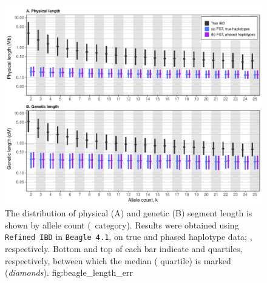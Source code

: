 

\begin{figure}[!htb]
\includegraphics[width=\textwidth]{./img/ch4/beagle_length_err}
{The distribution of physical (A) and genetic (B) segment length is shown by allele count (\fk{}~category).
Results were obtained using \texttt{Refined\,IBD} in \texttt{Beagle\,4.1}, on true and phased haplotype data; \ie {}, respectively.
Bottom and top of each bar indicate  and  quartiles, respectively, between which the median ( quartile) is marked (\emph{diamonds}).}
{fig:beagle_length_err}
\end{figure}
